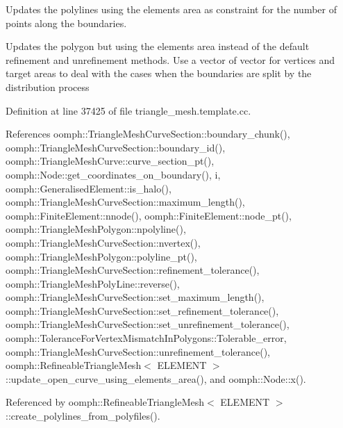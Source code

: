 Updates the polylines using the elements area as constraint for the number of points along the boundaries. 

Updates the polygon but using the elements area instead of the default refinement and unrefinement methods. Use a vector of vector for vertices and target areas to deal with the cases when the boundaries are split by the distribution process 

Definition at line 37425 of file triangle\+\_\+mesh.\+template.\+cc.



References oomph\+::\+Triangle\+Mesh\+Curve\+Section\+::boundary\+\_\+chunk(), oomph\+::\+Triangle\+Mesh\+Curve\+Section\+::boundary\+\_\+id(), oomph\+::\+Triangle\+Mesh\+Curve\+::curve\+\_\+section\+\_\+pt(), oomph\+::\+Node\+::get\+\_\+coordinates\+\_\+on\+\_\+boundary(), i, oomph\+::\+Generalised\+Element\+::is\+\_\+halo(), oomph\+::\+Triangle\+Mesh\+Curve\+Section\+::maximum\+\_\+length(), oomph\+::\+Finite\+Element\+::nnode(), oomph\+::\+Finite\+Element\+::node\+\_\+pt(), oomph\+::\+Triangle\+Mesh\+Polygon\+::npolyline(), oomph\+::\+Triangle\+Mesh\+Curve\+Section\+::nvertex(), oomph\+::\+Triangle\+Mesh\+Polygon\+::polyline\+\_\+pt(), oomph\+::\+Triangle\+Mesh\+Curve\+Section\+::refinement\+\_\+tolerance(), oomph\+::\+Triangle\+Mesh\+Poly\+Line\+::reverse(), oomph\+::\+Triangle\+Mesh\+Curve\+Section\+::set\+\_\+maximum\+\_\+length(), oomph\+::\+Triangle\+Mesh\+Curve\+Section\+::set\+\_\+refinement\+\_\+tolerance(), oomph\+::\+Triangle\+Mesh\+Curve\+Section\+::set\+\_\+unrefinement\+\_\+tolerance(), oomph\+::\+Tolerance\+For\+Vertex\+Mismatch\+In\+Polygons\+::\+Tolerable\+\_\+error, oomph\+::\+Triangle\+Mesh\+Curve\+Section\+::unrefinement\+\_\+tolerance(), oomph\+::\+Refineable\+Triangle\+Mesh$<$ E\+L\+E\+M\+E\+N\+T $>$\+::update\+\_\+open\+\_\+curve\+\_\+using\+\_\+elements\+\_\+area(), and oomph\+::\+Node\+::x().



Referenced by oomph\+::\+Refineable\+Triangle\+Mesh$<$ E\+L\+E\+M\+E\+N\+T $>$\+::create\+\_\+polylines\+\_\+from\+\_\+polyfiles().

\mbox{\label{classoomph_1_1RefineableTriangleMesh_ae089d459099bb928ced9b8a306b99df5}} 
